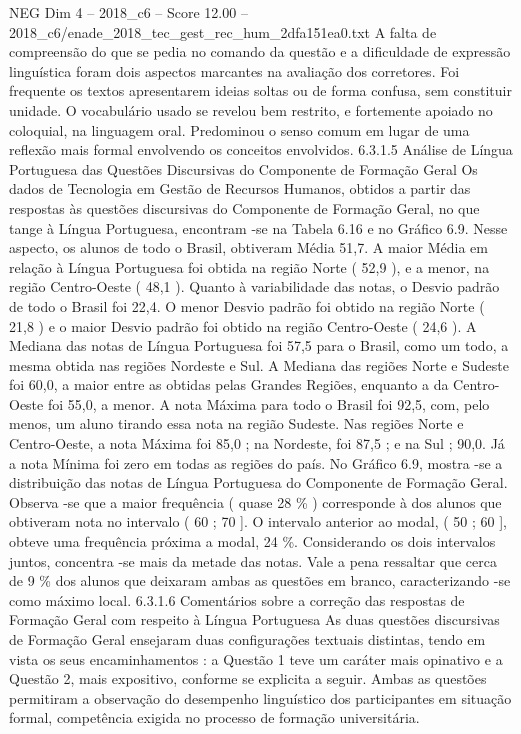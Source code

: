 \begin{textsample}{NEG Dim 4 – 2018\_c6 – Score 12.00 – 2018\_c6/enade\_2018\_tec\_gest\_rec\_hum\_2dfa151ea0.txt}
A falta de compreensão do que se pedia no comando da questão e a dificuldade de expressão linguística foram dois aspectos marcantes na avaliação dos corretores.
Foi frequente os textos apresentarem ideias soltas ou de forma confusa, sem constituir unidade.
O vocabulário usado se revelou bem restrito, e fortemente apoiado no coloquial, na linguagem oral.
Predominou o senso comum em lugar de uma reflexão mais formal envolvendo os conceitos envolvidos. 6.3.1.5 Análise de Língua Portuguesa das Questões Discursivas do Componente de Formação Geral Os dados de Tecnologia em Gestão de Recursos Humanos, obtidos a partir das respostas às questões discursivas do Componente de Formação Geral, no que tange à Língua Portuguesa, encontram -se na Tabela 6.16 e no Gráfico 6.9.
Nesse aspecto, os alunos de todo o Brasil, obtiveram Média 51,7.
A maior Média em relação à Língua Portuguesa foi obtida na região Norte ( 52,9 ), e a menor, na região Centro-Oeste ( 48,1 ).
Quanto à variabilidade das notas, o Desvio padrão de todo o Brasil foi 22,4.
O menor Desvio padrão foi obtido na região Norte ( 21,8 ) e o maior Desvio padrão foi obtido na região Centro-Oeste ( 24,6 ).
A Mediana das notas de Língua Portuguesa foi 57,5 para o Brasil, como um todo, a mesma obtida nas regiões Nordeste e Sul.
A Mediana das regiões Norte e Sudeste foi 60,0, a maior entre as obtidas pelas Grandes Regiões, enquanto a da Centro-Oeste foi 55,0, a menor.
A nota Máxima para todo o Brasil foi 92,5, com, pelo menos, um aluno tirando essa nota na região Sudeste.
Nas regiões Norte e Centro-Oeste, a nota Máxima foi 85,0 ; na Nordeste, foi 87,5 ; e na Sul ; 90,0.
Já a nota Mínima foi zero em todas as regiões do país.
No Gráfico 6.9, mostra -se a distribuição das notas de Língua Portuguesa do Componente de Formação Geral.
Observa -se que a maior frequência ( quase 28 \% ) corresponde à dos alunos que obtiveram nota no intervalo ( 60 ; 70 ].
O intervalo anterior ao modal, ( 50 ; 60 ], obteve uma frequência próxima a modal, 24 \%.
Considerando os dois intervalos juntos, concentra -se mais da metade das notas.
Vale a pena ressaltar que cerca de 9 \% dos alunos que deixaram ambas as questões em branco, caracterizando -se como máximo local. 6.3.1.6 Comentários sobre a correção das respostas de Formação Geral com respeito à Língua Portuguesa As duas questões discursivas de Formação Geral ensejaram duas configurações textuais distintas, tendo em vista os seus encaminhamentos : a Questão 1 teve um caráter mais opinativo e a Questão 2, mais expositivo, conforme se explicita a seguir.
Ambas as questões permitiram a observação do desempenho linguístico dos participantes em situação formal, competência exigida no processo de formação universitária.

\end{textsample}
